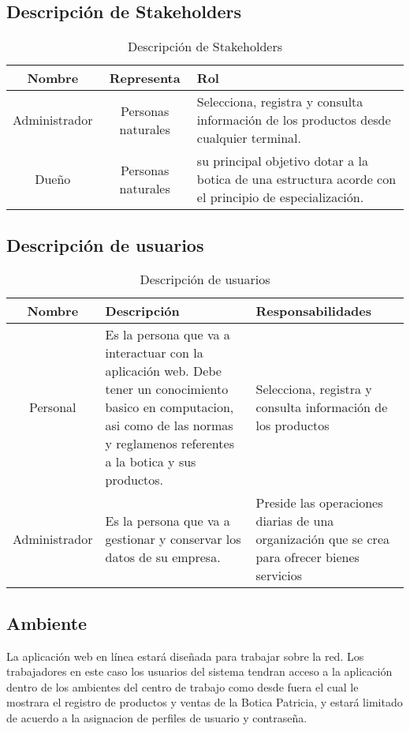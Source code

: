 \documentclass[a4paper,11pt, spanish]{report}
\begin{document}
{{      \subsection{Descripción de Stakeholders}

        {\renewcommand{\arraystretch}{1.7}%
        \noindent\begin{table}[H]
        \noindent\begin{tabularx}{\textwidth}{c|c|X}
          \textbf{{\large Nombre}} & \textbf{{\large Representa}} & \textbf{{\large Rol}} \\
          \hline
          Administrador & Personas naturales & Selecciona, registra y consulta información de los productos desde cualquier terminal.\\
          Dueño & Personas naturales & su principal objetivo dotar a la botica de una estructura acorde con el principio de especialización.\\
        \end{tabularx}
        \caption{Descripción de Stakeholders}
        \end{table}

      \subsection{Descripción de usuarios}

        {\renewcommand{\arraystretch}{1.7}%
        \noindent\begin{table}[H]
        \noindent\begin{tabularx}{\textwidth}{c|X|X}
          \textbf{{\large Nombre}} & \textbf{{\large Descripción}} & \textbf{{\large Responsabilidades}} \\
          \hline
          Personal & Es la persona que va a interactuar con la aplicación web. Debe tener un conocimiento basico en computacion, asi como de las normas y reglamenos referentes a la botica y sus productos. & Selecciona, registra y consulta información de los productos \\
          Administrador & Es la persona que va a gestionar y conservar los datos de su empresa. & Preside las operaciones diarias de una organización que se crea para ofrecer bienes servicios
        \end{tabularx}
        \caption{Descripción de usuarios}
        \end{table}

      \subsection{Ambiente}
        La aplicación web en línea estará diseñada para trabajar sobre la red. Los trabajadores
        en este caso los usuarios del sistema tendran acceso a la aplicación dentro de los ambientes del centro
        de trabajo como desde fuera el cual le mostrara el registro de productos y ventas de la Botica Patricia,
        y estará limitado de acuerdo a la asignacion de perfiles de usuario y contraseña.

}}}}
\end{document}
